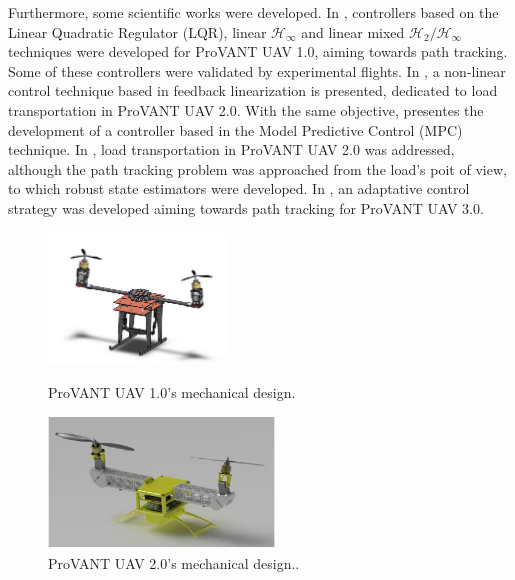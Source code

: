 Furthermore, some scientific works were developed. In \cite{Donadel2015}, controllers based on the Linear Quadratic Regulator (LQR), linear $\mathcal{H}_\infty$  and linear mixed $\mathcal{H}_2/\mathcal{H}_\infty$ techniques were developed for ProVANT UAV 1.0, aiming towards path tracking. Some of these controllers were validated by experimental flights. In \cite{Marcelinol2014}, a non-linear control technique based in feedback linearization is presented, dedicated to load transportation in ProVANT UAV 2.0. With the same objective, \cite{Richard2016} presentes the development of a controller based in the Model Predictive Control (MPC) technique. In \cite{Brenner2016}, load transportation in ProVANT UAV 2.0 was addressed, although the path tracking problem was approached from the load's poit of view, to which robust state estimators were developed. In \cite{Daniel2016}, an adaptative control strategy was developed aiming towards path tracking for ProVANT UAV 3.0.

\begin{figure} [H]
	\centering
	\begin{minipage}{.5\textwidth}
		\centering
		\includegraphics[height=3.5cm]{figuras/VANT1}
		\caption{ProVANT UAV 1.0's mechanical design.}
		\label{vant1}
	\end{minipage}%
	\begin{minipage}{.5\textwidth}
		\centering
		\includegraphics[height=3.5cm]{figuras/VANT2}
		\caption{ProVANT UAV 2.0's mechanical design..}
		\label{vant2}
		\end{minipage}
\end{figure}
				
